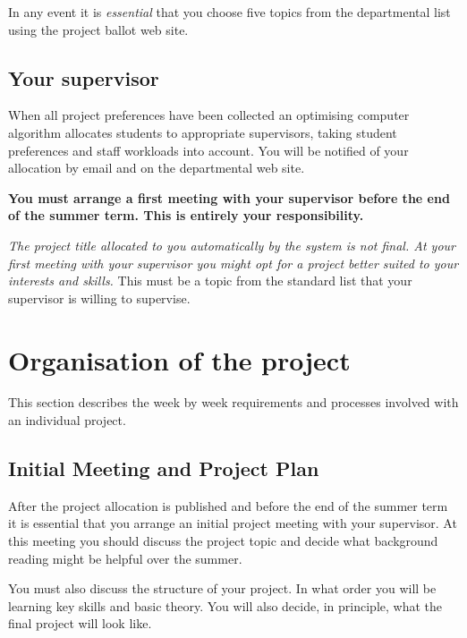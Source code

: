 \documentclass[11pt]{article}
\begin{document}
In any event it is \emph{essential} that you choose five topics from the departmental list using the project ballot web site.

\subsection{Your supervisor}
When all project preferences have been collected an optimising computer algorithm allocates students to appropriate supervisors, taking student preferences and staff workloads into account.  You will be notified of your allocation by email and on the departmental web site.

\textbf{You must arrange a first meeting with your supervisor before the end of the summer term.  This is entirely your responsibility.}

\textit{The project title allocated to you automatically by the system is not final.  At your first meeting with your supervisor you might opt for a project better suited to your interests and skills.}  This must be a topic from the standard list that your supervisor is willing to supervise.

\newpage

\section{Organisation of the project}
This section describes the week by week requirements and processes involved with an individual project.

\subsection{Initial Meeting and Project Plan}
After the project allocation is published and before the end of the summer term it is essential that you arrange an initial project meeting with your supervisor.  At this meeting you should discuss the project topic and decide what  background reading might be helpful over the summer.

You must also discuss the structure of your project.  In what order you will be learning key skills and basic theory.  You will also decide, in principle, what the final project will look like.
\end{document}
